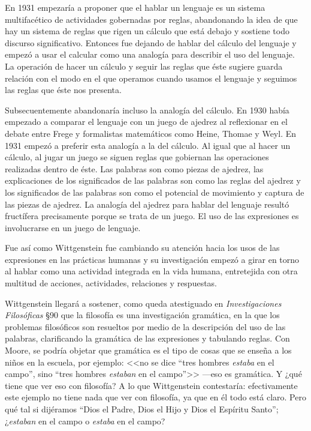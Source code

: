 En 1931 empezaría a proponer que el hablar un lenguaje es un sistema
multifacético de actividades gobernadas por reglas, abandonando la idea de que
hay un sistema de reglas que rigen un cálculo que está debajo y sostiene todo
discurso significativo. Entonces fue dejando de hablar del cálculo del lenguaje
y empezó a usar el calcular como una analogía para describir el uso del
lenguaje. La operación de hacer un cálculo y seguir las reglas que éste sugiere
guarda relación con el modo en el que operamos cuando usamos el lenguaje y
seguimos las reglas que éste nos presenta.

Subsecuentemente abandonaría incluso la analogía del cálculo. En 1930 había
empezado a comparar el lenguaje con un juego de ajedrez al reflexionar en el
debate entre Frege y formalistas matemáticos como Heine, Thomae y
Weyl.\autocite[cf.~][p.134]{rulesngrammar} En 1931 empezó a preferir esta
analogía a la del cálculo. Al igual que al hacer un cálculo, al jugar un juego
se siguen reglas que gobiernan las operaciones realizadas dentro de éste. Las
palabras son como piezas de ajedrez, las explicaciones de los significados de
las palabras son como las reglas del ajedrez y los significados de las palabras
son como el potencial de movimiento y captura de las piezas de ajedrez. La
analogía del ajedrez para hablar del lenguaje resultó fructífera precisamente
porque se trata de un juego. El uso de las expresiones es involucrarse en un
juego de lenguaje.

Fue así como Wittgenstein fue cambiando su atención hacia los usos de las
expresiones en las prácticas humanas y su investigación empezó a girar en torno
al hablar como una actividad integrada en la vida humana, entretejida con otra
multitud de acciones, actividades, relaciones y respuestas.

Wittgenstein llegará a sostener, como queda atestiguado en \emph{Investigaciones
  Filosóficas} \S90 que la filosofía es una investigación gramática, en la que
los problemas filosóficos son resueltos por medio de la descripción del uso de
las palabras, clarificando la gramática de las expresiones y tabulando reglas.
Con Moore, se podría objetar que gramática es el tipo de cosas que se enseña a
los niños en la escuela, por ejemplo: <<no se dice ``tres hombres \emph{estaba}
en el campo'', sino ``tres hombres \emph{estaban} en el campo''>> ---eso es
gramática. Y ¿qué tiene que ver eso con filosofía? A lo que Wittgenstein
contestaría: efectivamente este ejemplo no tiene nada que ver con filosofía, ya
que en él todo está claro. Pero qué tal si dijéramos ``Dios el Padre, Dios el
Hijo y Dios el Espíritu Santo''; ¿\emph{estaban} en el campo o \emph{estaba} en
el campo?\autocite[cf.~][55]{rulesngrammar}

